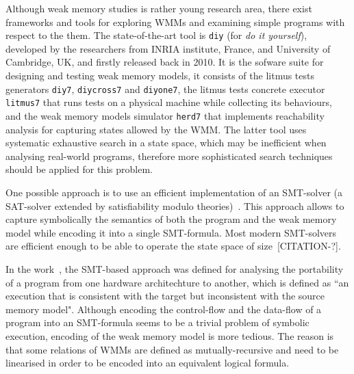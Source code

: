 Although weak memory studies is rather young research area, there exist frameworks and tools for exploring WMMs and examining simple programs with respect to the them. The state-of-the-art tool is \texttt{diy} (for \textit{do it yourself}), developed by the researchers from INRIA institute, France, and University of Cambridge, UK, and firstly released back in 2010. It is the sofware suite for designing and testing weak memory models, it consists of the litmus tests generators \texttt{diy7}, \texttt{diycross7} and \texttt{diyone7}, the litmus tests concrete executor \texttt{litmus7} that runs tests on a physical machine while collecting its behaviours, and the weak memory models simulator \texttt{herd7} that implements reachability analysis for capturing states allowed by the WMM. The latter tool uses systematic exhaustive search in a state space, which may be inefficient when analysing real-world programs, therefore more sophisticated search techniques should be applied for this problem. 

One possible approach is to use an efficient implementation of an SMT-solver (a SAT-solver extended by satisfiability modulo theories)~\cite{Porthos17}. %
This approach allows to capture symbolically the semantics of both the program and the weak memory model while encoding it into a single SMT-formula.
Most modern SMT-solvers are efficient enough to be able to operate the state space of size~[CITATION-?].

In the work~\cite{Porthos17}, the SMT-based approach was defined for analysing the portability of a program from one hardware architechture to another, which is defined as ``an execution that is consistent with the target but inconsistent with the source memory model". Although encoding the control-flow and the data-flow of a program into an SMT-formula seems to be a trivial problem of symbolic execution, encoding of the weak memory model is more tedious. The reason is that some relations of WMMs are defined as mutually-recursive and need to be linearised in order to be encoded into an equivalent logical formula.


